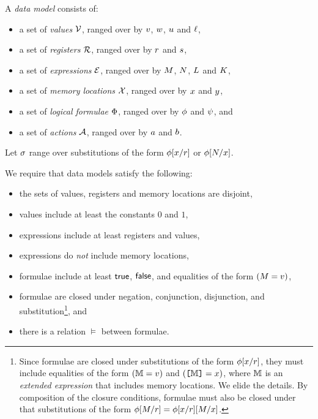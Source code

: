 A \emph{data model} consists of:
\begin{itemize}
\item a set of \emph{values} $\mathcal{V}$, ranged over by
  $v$, $w$, $u$ and $\ell$,
\item a set of \emph{registers} $\mathcal{R}$, ranged over by
  $r$ and $s$,
\item a set of \emph{expressions} $\mathcal{E}$, ranged over by
  $M$, $N$, $L$ and $K$,
\item a set of \emph{memory locations} $\mathcal{X}$, ranged over by $x$ and
  $y$, 
\item a set of \emph{logical formulae} $\Phi$, ranged over by
  $\phi$ and $\psi$, and
\item a set of \emph{actions} $\mathcal{A}$, ranged over by $a$ and $b$.
\end{itemize}

Let $\sigma$ range over substitutions of the form
$\phi[x/r]$ or $\phi[N/x]$.

We require that data models satisfy the following:
\begin{itemize}
\item the sets of values, registers and memory locations are disjoint,
\item values include at least the constants $0$ and $1$,
\item expressions include at least registers and values,
\item expressions do \emph{not} include memory locations, %
\item formulae include at least $\mathsf{true}$, $\mathsf{false}$, and equalities of the form
  $(M=v)$, %
\item formulae are closed under negation, conjunction, disjunction, and
  substitution\footnote{Since formulae are closed under substitutions of the
    form $\phi[x/r]$, they must include equalities of the form
    $(\mathbb{M}=v)$ and $(\texttt{[}\mathbb{M}\texttt{]}=x)$, where $\mathbb{M}$ is an
    \emph{extended expression} that includes memory locations.  We elide the
    details.  By composition of the closure conditions, formulae must also be
    closed under that substitutions of the form
    $\phi[M/r]=\phi[x/r][M/x]$.}, and
\item there is a relation $\vDash$ between formulae.
\end{itemize}

